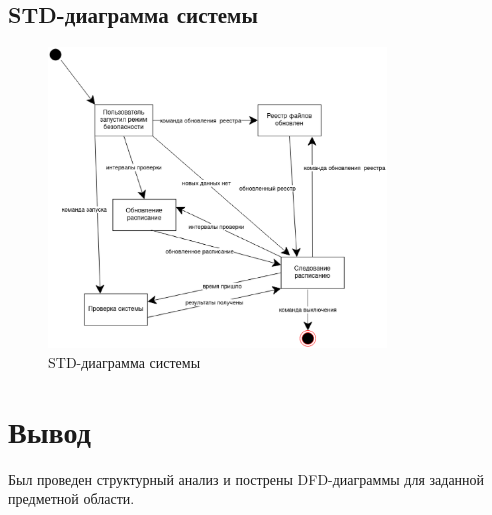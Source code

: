 \subsection{STD-диаграмма системы}

\begin{figure}[h!]
	\includegraphics[width=0.8\textwidth]{images/2/std.eps}
	\caption{STD-диаграмма системы}
\end{figure}
\section{Вывод}

Был проведен структурный анализ и пострены DFD-диаграммы для заданной предметной области. 
